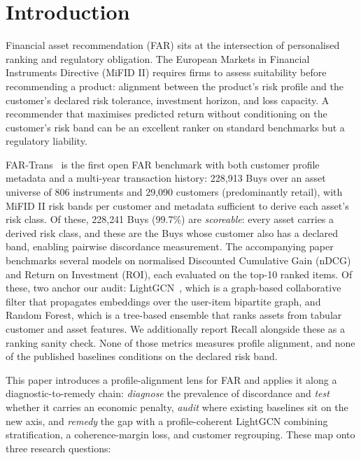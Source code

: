 \section{Introduction}
\label{sec:intro}

Financial asset recommendation (FAR) sits at the intersection of personalised ranking and regulatory obligation. The European Markets in Financial Instruments Directive (MiFID II) requires firms to assess suitability before recommending a product: alignment between the product's risk profile and the customer's declared risk tolerance, investment horizon, and loss capacity. A recommender that maximises predicted return without conditioning on the customer's risk band can be an excellent ranker on standard benchmarks but a regulatory liability.

FAR-Trans~\cite{sanzcruzado2024fartransinvestmentdatasetfinancial} is the first open FAR benchmark with both customer profile metadata and a multi-year transaction history: 228{,}913 Buys over an asset universe of 806 instruments and 29{,}090 customers (predominantly retail), with MiFID II risk bands per customer and metadata sufficient to derive each asset's risk class. Of these, 228{,}241 Buys (99.7\%) are \emph{scoreable}: every asset carries a derived risk class, and these are the Buys whose customer also has a declared band, enabling pairwise discordance measurement. The accompanying paper benchmarks several models on normalised Discounted Cumulative Gain (nDCG) and Return on Investment (ROI), each evaluated on the top-10 ranked items. Of these, two anchor our audit: LightGCN~\cite{he2020lightgcnsimplifyingpoweringgraph}, which is a graph-based collaborative filter that propagates embeddings over the user-item bipartite graph, and Random Forest, which is a tree-based ensemble that ranks assets from tabular customer and asset features. We additionally report Recall alongside these as a ranking sanity check. None of those metrics measures profile alignment, and none of the published baselines conditions on the declared risk band.

This paper introduces a profile-alignment lens for FAR and applies it along a diagnostic-to-remedy chain: \emph{diagnose} the prevalence of discordance and \emph{test} whether it carries an economic penalty, \emph{audit} where existing baselines sit on the new axis, and \emph{remedy} the gap with a profile-coherent LightGCN combining stratification, a coherence-margin loss, and customer regrouping. These map onto three research questions:

